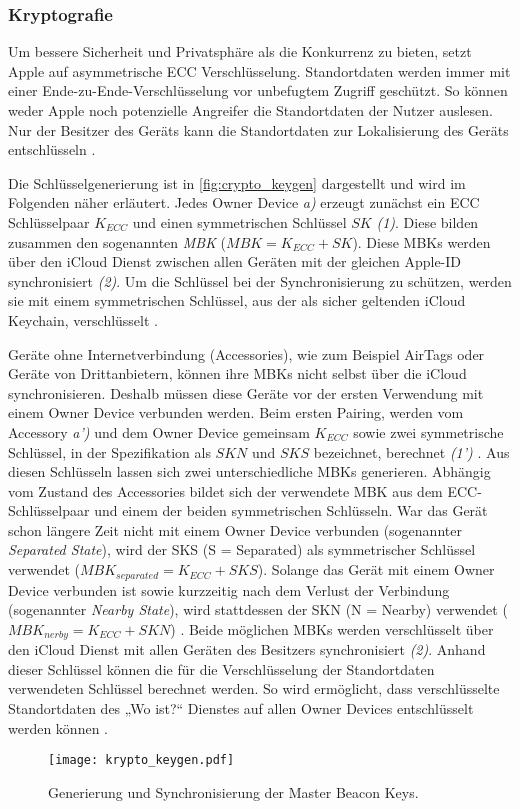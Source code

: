 \subsubsection{Kryptografie}
\label{sec:Kryptografie}

Um bessere Sicherheit und Privatsphäre als die Konkurrenz zu bieten, setzt Apple auf asymmetrische \ac{ECC} Verschlüsselung.
Standortdaten werden immer mit einer Ende-zu-Ende-Verschlüsselung vor unbefugtem Zugriff geschützt.
So können weder Apple noch potenzielle Angreifer die Standortdaten der Nutzer auslesen.
Nur der Besitzer des Geräts kann die Standortdaten zur Lokalisierung des Geräts entschlüsseln \cite{Greenberg_FindMyCrypto}.

Die Schlüsselgenerierung ist in \autoref{fig:crypto_keygen} dargestellt und wird im Folgenden näher erläutert.
Jedes Owner Device \textit{a)} erzeugt zunächst ein \ac{ECC} Schlüsselpaar $K_{ECC}$ und einen symmetrischen Schlüssel $SK$ \textit{(1)}.
Diese bilden zusammen den sogenannten \textit{\ac{MBK}} ($MBK = K_{ECC} + SK$).
Diese \acp{MBK} werden über den iCloud Dienst zwischen allen Geräten mit der gleichen Apple-ID synchronisiert \textit{(2)}.
Um die Schlüssel bei der Synchronisierung zu schützen, werden sie mit einem symmetrischen Schlüssel, aus der als sicher geltenden iCloud Keychain, verschlüsselt \cite{Heinrich_FindMy,Afonin_iCloudKeychain}.

   
Geräte ohne Internetverbindung (Accessories), wie zum Beispiel AirTags oder Geräte von Drittanbietern, können ihre \acp{MBK} nicht selbst über die iCloud synchronisieren.
Deshalb müssen diese Geräte vor der ersten Verwendung mit einem Owner Device verbunden werden.
Beim ersten Pairing, werden vom Accessory \textit{a')} und dem Owner Device gemeinsam $K_{ECC}$ sowie zwei symmetrische Schlüssel, in der Spezifikation als $SKN$ und $SKS$ bezeichnet, berechnet \textit{(1')} \cite{Apple_FindMySpec}.
Aus diesen Schlüsseln lassen sich zwei unterschiedliche \acp{MBK} generieren.
Abhängig vom Zustand des Accessories bildet sich der verwendete \ac{MBK} aus dem \ac{ECC}-Schlüsselpaar und einem der beiden symmetrischen Schlüsseln.
War das Gerät schon längere Zeit nicht mit einem Owner Device verbunden (sogenannter \textit{Separated State}), wird der SKS (S = Separated) als symmetrischer Schlüssel verwendet ($MBK_{separated} = K_{ECC} + SKS$).
Solange das Gerät mit einem Owner Device verbunden ist sowie kurzzeitig nach dem Verlust der Verbindung (sogenannter \textit{Nearby State}), wird stattdessen der SKN (N = Nearby) verwendet ($MBK_{nerby} = K_{ECC} + SKN$) \cite{Apple_FindMySpec}.
Beide möglichen \acp{MBK} werden verschlüsselt über den iCloud Dienst mit allen Geräten des Besitzers synchronisiert \textit{(2)}.
Anhand dieser Schlüssel können die für die Verschlüsselung der Standortdaten verwendeten Schlüssel berechnet werden.
So wird ermöglicht, dass verschlüsselte Standortdaten des „Wo ist?“ Dienstes auf allen Owner Devices entschlüsselt werden können \cite{Heinrich_AirGuard}.
\begin{figure}[ht]
    \centering
    \texttt{[image: krypto\_keygen.pdf]}
    \caption{Generierung und Synchronisierung der Master Beacon Keys.}
    \label{fig:crypto_keygen}
\end{figure}


